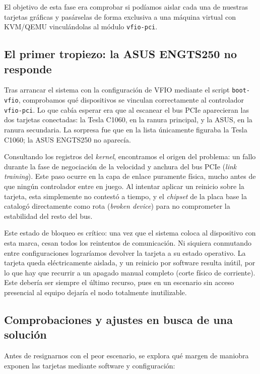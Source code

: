 El objetivo de esta fase era comprobar si podíamos aislar cada una de nuestras tarjetas 
gráficas y pasárselas de forma exclusiva a una máquina virtual con KVM/QEMU vinculándolas
al módulo \texttt{vfio-pci}. 


\subsection{El primer tropiezo: la ASUS ENGTS250 no responde}

Tras arrancar el sistema con la configuración de VFIO mediante el script \texttt{boot-vfio}, 
comprobamos qué dispositivos se vinculan correctamente al controlador \texttt{vfio-pci}. 
Lo que cabía esperar era que al escanear el bus PCIe aparecieran las dos tarjetas conectadas: la Tesla C1060, en la
ranura principal, y la ASUS, en la ranura secundaria.
La sorpresa fue que en la lista únicamente figuraba la Tesla C1060; la ASUS ENGTS250 no aparecía.

Consultando los registros del \textit{kernel}, encontramos el origen del problema: 
un fallo durante la fase de negociación de la velocidad y anchura del bus PCIe (\textit{link training}). 
Este paso ocurre en la capa de enlace puramente física, mucho antes de que ningún controlador entre en juego. 
Al intentar aplicar un reinicio sobre la tarjeta, esta simplemente no contestó a tiempo, y el 
\textit{chipset} de la placa base la catalogó directamente como rota (\textit{broken device}) para no 
comprometer la estabilidad del resto del bus.

Este estado de bloqueo es crítico: una vez que el sistema coloca al dispositivo con esta marca, 
cesan todos los 
reintentos de comunicación. Ni siquiera conmutando entre configuraciones 
lograríamos devolver la tarjeta a su estado operativo. La tarjeta queda eléctricamente aislada, y un 
reinicio por software resulta inútil, por lo que hay que recurrir a un apagado manual completo (corte físico de 
corriente). Este debería ser siempre el último recurso, pues en un escenario sin acceso presencial al 
equipo dejaría el nodo totalmente inutilizable.

\subsection{Comprobaciones y ajustes en busca de una solución}

Antes de resignarnos con el peor escenario, se explora qué margen de 
maniobra exponen las tarjetas mediante software y configuración:

